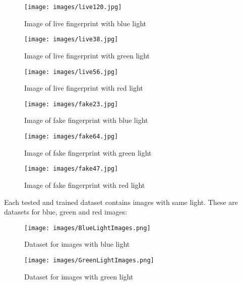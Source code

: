 \documentclass{article}
\begin{document}
\begin{figure}[htbp]
  \begin{minipage}[b]{0.3\linewidth}
    \centering
    \texttt{[image: images/live120.jpg]}
    \caption{Image of live fingerprint with blue light}
  \end{minipage}
  \hspace{0.3cm}
  \begin{minipage}[b]{0.3\linewidth}
    \centering
    \texttt{[image: images/live38.jpg]}
    \caption{Image of live fingerprint with green light}
  \end{minipage}
  \hspace{0.3cm}
    \begin{minipage}[b]{0.3\linewidth}
    \centering
    \texttt{[image: images/live56.jpg]}
    \caption{Image of live fingerprint with red light}
  \end{minipage}
\end{figure}

\begin{figure}[htbp]
  \begin{minipage}[b]{0.3\linewidth}
    \centering
    \texttt{[image: images/fake23.jpg]}
    \caption{Image of fake fingerprint with blue light}
  \end{minipage}
  \hspace{0.3cm}
  \begin{minipage}[b]{0.3\linewidth}
    \centering
    \texttt{[image: images/fake64.jpg]}
    \caption{Image of fake fingerprint with green light}
  \end{minipage}
  \hspace{0.3cm}
    \begin{minipage}[b]{0.3\linewidth}
    \centering
    \texttt{[image: images/fake47.jpg]}
    \caption{Image of fake fingerprint with red light}
  \end{minipage}
\end{figure}

Each tested and trained dataset contains images with same light. These are datasets for blue, green and red images:
\begin{figure}[htbp]
    \centering
    \texttt{[image: images/BlueLightImages.png]}
    \caption{Dataset for images with blue light}
\end{figure}

\begin{figure}[htbp]
    \centering
    \texttt{[image: images/GreenLightImages.png]}
    \caption{Dataset for images with green light}
\end{figure}
\end{document}

